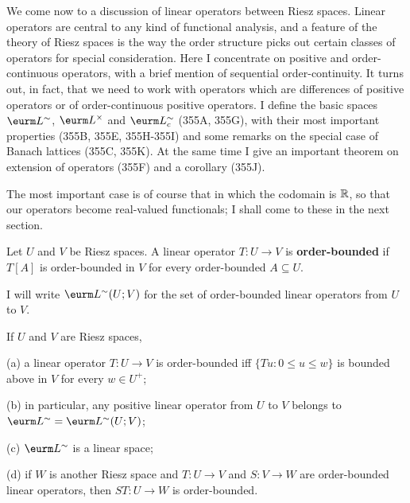 
\def\chaptername{Riesz spaces}
\def\sectionname{Spaces of linear operators}


We come now to a discussion of linear operators between Riesz spaces.
Linear operators are central to any kind of functional
analysis, and a feature of the theory of Riesz spaces is the way the
order structure picks out certain classes of operators for special
consideration.   Here I concentrate on positive and order-continuous
operators, with a brief mention of sequential order-continuity.   It
turns out, in fact, that we need to work with operators which are
differences of positive operators or of order-continuous positive
operators.   I define the basic spaces $\eurm L^{\sim}$, $\eurm
L^{\times}$ and $\eurm L^{\sim}_c$ (355A, 355G), with their most
important properties (355B, 355E, 355H-355I)
and some remarks on the special case of Banach lattices (355C, 355K).
At the same time I give an important theorem on extension of operators
(355F) and a corollary (355J).

The most important case is of course that in which the codomain is
$\Bbb R$, so that our operators become real-valued functionals;
I shall come to these in the next section.

  Let $U$ and $V$ be Riesz spaces.   A linear
operator $T:U\to V$ is
{\bf order-bounded} if $T[A]$ is order-bounded in $V$ for every
order-bounded $A\subseteq U$.

I will write $\eurm L^{\sim}(U;V)$ for the set of order-bounded linear
operators from $U$ to $V$.

 If $U$ and $V$ are Riesz spaces,

(a) a linear operator $T:U\to V$ is order-bounded iff
$\{Tu:0\le u\le w\}$ is bounded above in $V$ for every $w\in U^+$;

(b) in particular, any positive linear operator from $U$ to $V$ belongs
to $\eurm L^{\sim}=\eurm L^{\sim}(U;V)$;

(c) $\eurm L^{\sim}$ is a linear space;

(d) if $W$ is another Riesz space and $T:U\to V$ and $S:V\to W$ are
order-bounded linear operators, then $ST:U\to W$ is order-bounded.


